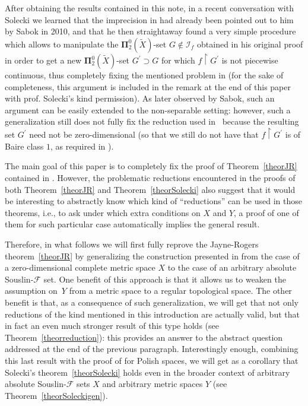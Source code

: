\documentclass{raex}
\theoremstyle{plain}
\theoremstyle{definition}
\theoremstyle{remark}
\def\P{\mathbf{\Pi}}
\def\F{\mathcal{F}}
\def\I{\mathcal{I}}
\begin{document}
After obtaining the results contained in this note, in a recent conversation with Solecki we learned that the imprecision in \cite[Proof of Theorem~3.1]{sol} had already been pointed out to him by Sabok in 2010, and that he then straightaway found a very simple procedure which allows to manipulate the $\P^0_2(\widetilde{X})$-set $G \notin \I_f$ obtained in his original proof in order to get a new $\P^0_2(\widetilde{X})$-set $G^\prime \supset G$ for which $f \restriction G^\prime$ is not piecewise continuous, thus completely fixing the mentioned problem in \cite[Proof of Theorem~3.1]{sol} (for the sake of completeness, this argument is included in the remark at the end of this paper with prof. Solecki's kind permission). As later observed by Sabok, such an argument can be easily extended to the non-separable setting: however, such a generalization still does not fully fix the reduction used in~\cite[Proof of Theorem~1.1]{mot-sem} because the resulting set $G^\prime$ need not be zero-dimensional (so that we still do not have that $f \restriction G^\prime$ is of Baire class $1$, as required in \cite[Theorem~2.1]{mot-sem}). 


The main goal of this paper is to completely fix the proof of Theorem~\ref{theorJR} contained in \cite{mot-sem}. However, the problematic reductions encountered in the proofs of both Theorem~\ref{theorJR} and Theorem~\ref{theorSolecki} also suggest that it would be interesting to abstractly know which kind of ``reductions'' can be used in those theorems, i.e., to ask under which extra conditions on $X$ and $Y$, a proof of one of them for such particular case automatically implies the general result.

Therefore, in what follows we will first fully reprove the Jayne-Rogers theorem~\ref{theorJR} by generalizing the construction presented in \cite[Proof of Theorem~2.1]{mot-sem} from the case of a zero-dimensional complete metric space $X$ to the case of an arbitrary absolute Souslin-$\F$ set. One benefit of this approach is that it allows us to weaken the assumption on~$Y$ from a metric space to a regular topological space. The other benefit is that, as a consequence of such generalization, we will get that not only reductions of the kind mentioned in this introduction are actually valid, but that in fact an even much stronger result of this type holds (see Theorem~\ref{theorreduction}): this provides an answer to the abstract question addressed at the end of the previous paragraph. Interestingly enough, combining this last result with the proof of \cite[Theorem~3.1]{sol} for Polish spaces, we will get as a corollary that Solecki's theorem~\ref{theorSolecki} holds even in the broader context of arbitrary absolute Souslin-$\F$ sets $X$ and arbitrary metric spaces $Y$ (see Theorem~\ref{theorSoleckigen}).
\end{document}
